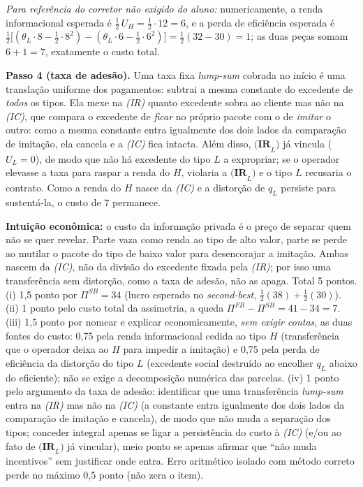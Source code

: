 \begin{solucao}
\emph{Para refer\^encia do corretor \textemdash{} n\~ao exigido do aluno:} numericamente, a renda informacional esperada \'e $\tfrac{1}{2}\,U_H = \tfrac{1}{2}\cdot 12 = 6$, e a perda de efici\^encia esperada \'e $\tfrac{1}{2}\big[(\theta_L\cdot 8 - \tfrac{1}{2}\cdot 8^{2}) - (\theta_L\cdot 6 - \tfrac{1}{2}\cdot 6^{2})\big] = \tfrac{1}{2}(32 - 30) = 1$; as duas pe\c{c}as somam $6 + 1 = 7$, exatamente o custo total.

\textbf{Passo 4 (taxa de ades\~ao).} Uma taxa fixa \emph{lump-sum} cobrada no in\'icio \'e uma transla\c{c}\~ao uniforme dos pagamentos: subtrai a mesma constante do excedente de \emph{todos} os tipos. Ela mexe na \emph{(IR)} \textemdash{} quanto excedente sobra ao cliente \textemdash{} mas n\~ao na \emph{(IC)}, que compara o excedente de \emph{ficar} no pr\'oprio pacote com o de \emph{imitar} o outro: como a mesma constante entra igualmente dos dois lados da compara\c{c}\~ao de imita\c{c}\~ao, ela cancela e a \emph{(IC)} fica intacta. Al\'em disso, $\textbf{(IR}_L\textbf{)}$ j\'a vincula ($U_L = 0$), de modo que n\~ao h\'a excedente do tipo $L$ a expropriar; se o operador elevasse a taxa para raspar a renda do $H$, violaria a $\textbf{(IR}_L\textbf{)}$ e o tipo $L$ recusaria o contrato. Como a renda do $H$ nasce da \emph{(IC)} e a distor\c{c}\~ao de $q_L$ persiste para sustent\'a-la, o custo de $7$ permanece.

\textbf{Intui\c{c}\~ao econ\^omica:} o custo da informa\c{c}\~ao privada \'e o pre\c{c}o de separar quem n\~ao se quer revelar. Parte vaza como renda ao tipo de alto valor, parte se perde ao mutilar o pacote do tipo de baixo valor para desencorajar a imita\c{c}\~ao. Ambas nascem da \emph{(IC)}, n\~ao da divis\~ao do excedente fixada pela \emph{(IR)}; por isso uma transfer\^encia sem distor\c{c}\~ao, como a taxa de ades\~ao, n\~ao as apaga.
\rubricalabel
Total 5 pontos. (i) 1{,}5 ponto por $\Pi^{SB} = 34$ (lucro esperado no \emph{second-best}, $\tfrac{1}{2}(38) + \tfrac{1}{2}(30)$). (ii) 1 ponto pelo custo total da assimetria, a queda $\Pi^{FB} - \Pi^{SB} = 41 - 34 = 7$. (iii) 1{,}5 ponto por nomear e explicar economicamente, \emph{sem exigir contas}, as duas fontes do custo: 0{,}75 pela renda informacional cedida ao tipo $H$ (transfer\^encia que o operador deixa ao $H$ para impedir a imita\c{c}\~ao) e 0{,}75 pela perda de efici\^encia da distor\c{c}\~ao do tipo $L$ (excedente social destru\'ido ao encolher $q_L$ abaixo do eficiente); n\~ao se exige a decomposi\c{c}\~ao num\'erica das parcelas. (iv) 1 ponto pelo argumento da taxa de ades\~ao: identificar que uma transfer\^encia \emph{lump-sum} entra na \emph{(IR)} mas n\~ao na \emph{(IC)} (a constante entra igualmente dos dois lados da compara\c{c}\~ao de imita\c{c}\~ao e cancela), de modo que n\~ao muda a separa\c{c}\~ao dos tipos; conceder integral apenas se ligar a persist\^encia do custo \`a \emph{(IC)} (e/ou ao fato de $\textbf{(IR}_L\textbf{)}$ j\'a vincular), meio ponto se apenas afirmar que ``n\~ao muda incentivos'' sem justificar onde entra. Erro aritm\'etico isolado com m\'etodo correto perde no m\'aximo 0{,}5 ponto (n\~ao zera o item).
\end{solucao}
